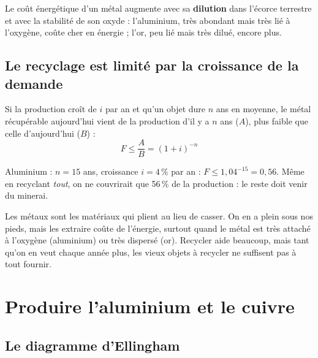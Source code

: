 Le coût énergétique d'un métal augmente avec sa \textbf{dilution} dans l'écorce terrestre et
avec la stabilité de son oxyde : l'aluminium, très abondant mais très lié à l'oxygène, coûte
cher en énergie ; l'or, peu lié mais très dilué, encore plus.

\subsection*{Le recyclage est limité par la croissance de la demande}


\begin{thmbox}[title=Taux de recyclage maximal]
Si la production croît de $i$ par an et qu'un objet dure $n$ ans en moyenne, le métal récupérable
aujourd'hui vient de la production d'il y a $n$ ans ($A$), plus faible que celle d'aujourd'hui
($B$) :
\[ F \le \frac{A}{B} = (1+i)^{-n} \]
\end{thmbox}

\begin{exbox}[title={Exemple chiffré (pas dans les diapositives)}]
Aluminium : $n = 15$ ans, croissance $i = 4\,\%$ par an :
$F \le 1{,}04^{-15} = 0{,}56$. Même en recyclant \emph{tout}, on ne couvrirait que 56\,\% de la
production : le reste doit venir du minerai.
\end{exbox}

\begin{goatbox}
Les métaux sont les matériaux qui plient au lieu de casser. On en a plein sous nos pieds, mais
les extraire coûte de l'énergie, surtout quand le métal est très attaché à l'oxygène (aluminium)
ou très dispersé (or). Recycler aide beaucoup, mais tant qu'on en veut chaque année plus, les
vieux objets à recycler ne suffisent pas à tout fournir.
\end{goatbox}

\section{Produire l'aluminium et le cuivre}

\subsection*{Le diagramme d'Ellingham}


